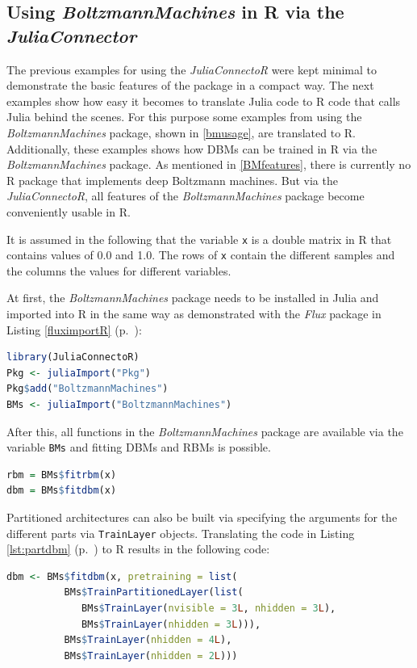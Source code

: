 \documentclass[12pt]{article}
\newcommand{\inlinecode}[1]{\texttt{#1}}
\newcommand{\apkg}[1]{\emph{#1}}
\begin{document}
\subsection{Using \apkg{BoltzmannMachines} in R via the \apkg{JuliaConnector}}\label{juliaconnectorDbmexample}
The previous examples for using the \apkg{JuliaConnectoR} were kept minimal to demonstrate the basic features of the package in a compact way.
The next examples show how easy it becomes to translate Julia code to R code that calls Julia behind the scenes.
For this purpose some examples from using the \apkg{BoltzmannMachines} package, shown in \ref{bmusage}, are translated to R.
Additionally, these examples shows how DBMs can be trained in R via the \apkg{BoltzmannMachines} package.
As mentioned in \ref{BMfeatures}, there is currently no R package that implements deep Boltzmann machines.
But via the \apkg{JuliaConnectoR}, all features of the \apkg{BoltzmannMachines} package become conveniently usable in R.

It is assumed in the following that the variable \inlinecode{x} is a double matrix in R that contains values of 0.0 and 1.0.
The rows of \inlinecode{x} contain the different samples and the columns the values for different variables.

At first, the \apkg{BoltzmannMachines} package needs to be installed in Julia and imported into R in the same way as demonstrated with the \apkg{Flux} package in Listing \ref{fluximportR} (p.~\pageref{fluximportR}):

\begin{lstlisting}[language=R, float=!h]
library(JuliaConnectoR)
Pkg <- juliaImport("Pkg")
Pkg$add("BoltzmannMachines")
BMs <- juliaImport("BoltzmannMachines")
\end{lstlisting}

After this, all functions in the \apkg{BoltzmannMachines} package are available via the variable \inlinecode{BMs} and fitting DBMs and RBMs is possible.

\begin{lstlisting}[language=R, float=!h]
rbm = BMs$fitrbm(x)
dbm = BMs$fitdbm(x)
\end{lstlisting}
 
Partitioned architectures can also be built via specifying the arguments for the different parts via \inlinecode{TrainLayer} objects.
Translating the code in Listing \ref{lst:partdbm} (p.~\pageref{lst:partdbm}) to R results in the following code:

\begin{lstlisting}[language=R,caption={Fitting a partitioned DBM in R via the \apkg{JuliaConnectoR}},label={lst:partdbmr}, float=!h]
dbm <- BMs$fitdbm(x, pretraining = list(
          BMs$TrainPartitionedLayer(list(
             BMs$TrainLayer(nvisible = 3L, nhidden = 3L),
             BMs$TrainLayer(nhidden = 3L))),
          BMs$TrainLayer(nhidden = 4L),
          BMs$TrainLayer(nhidden = 2L)))
\end{lstlisting}
\end{document}
